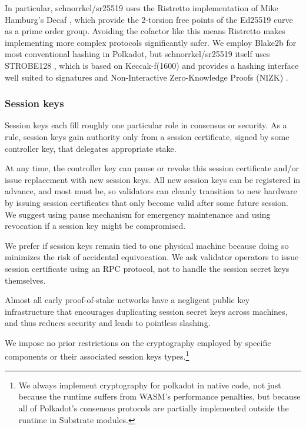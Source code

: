 In particular, schnorrkel/sr25519 uses the Ristretto implementation \cite{Ristretto} of Mike Hamburg's Decaf , which provide the 2-torsion free points of the Ed25519 curve as a prime order group.  Avoiding the cofactor like this means Ristretto makes implementing more complex protocols significantly safer.  We employ Blake2b for most conventional hashing in Polkadot, but schnorrkel/sr25519 itself uses STROBE128 \cite{STROBE}, which is based on Keccak-f(1600) and provides a hashing interface well suited to signatures and Non-Interactive Zero-Knowledge Proofs (NIZK) \cite{} \cite{}.

\subsubsection{Session keys}\label{sec:session_keys}

Session keys each fill roughly one particular role in consensus or security.  As a rule, session keys gain authority only from a session certificate, signed by some controller key, that delegates appropriate stake.  

At any time, the controller key can pause or revoke this session certificate and/or issue replacement with new session keys.  All new session keys can be registered in advance, and most must be, so validators can cleanly transition to new hardware by issuing session certificates that only become valid after some future session.  We suggest using pause mechanism for emergency maintenance and using revocation if a session key might be compromised.  

We prefer if session keys remain tied to one physical machine because doing so minimizes the risk of accidental equivocation.  We ask validator operators to issue session certificate using an RPC protocol, not to handle the session secret keys themselves.  

Almost all early proof-of-stake networks have a negligent public key infrastructure that encourages duplicating session secret keys across machines, and thus reduces security and leads to pointless slashing.

\smallskip

We impose no prior restrictions on the cryptography employed by specific components or their associated session keys types.\footnote{We always implement cryptography for polkadot in native code, not just because the runtime suffers from WASM's performance penalties, but because all of Polkadot's consensus protocols are partially implemented outside the runtime in Substrate modules.}

